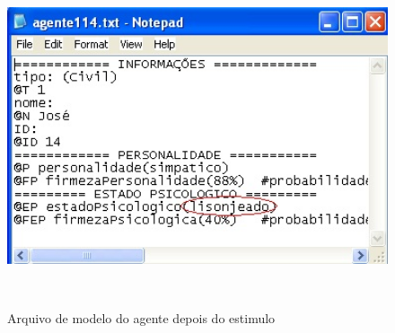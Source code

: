 \begin{figure}
\centering
\includegraphics [height=10cm]{figuras/jose_depois.jpg}
\caption{Arquivo de modelo do agente depois do estimulo}
\label{ze_depois}
\end{figure}


